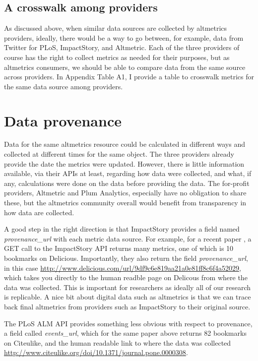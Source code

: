 \documentclass[letterpaper,superscriptaddress,showkeys,longbibliography]{revtex4-1}\usepackage{graphicx, color}
\begin{document}
\subsection*{A crosswalk among providers}

As discussed above, when similar data sources are collected by altmetrics providers, ideally, there would be a way to go between, for example, data from Twitter for PLoS, ImpactStory, and Altmetric. Each of the three providers of course has the right to collect metrics as needed for their purposes, but as altmetrics consumers, we should be able to compare data from the same source across providers. In Appendix Table A1, I provide a table to crosswalk metrics for the same data source among providers.

\section*{Data provenance}

Data for the same altmetrics resource could be calculated in different ways and collected at different times for the same object. The three providers already provide the date the metrics were updated. However, there is little information available, via their APIs at least, regarding how data were collected, and what, if any, calculations were done on the data before providing the data. The for-profit providers, Altmetric and Plum Analytics, especially have no obligation to share these, but the altmetrics community overall would benefit from transparency in how data are collected. 

A good step in the right direction is that ImpactStory provides a field named \emph{provenance\_url} with each metric data source. For example, for a recent paper \cite{piwowar2007}, a GET call to the ImpactStory API returns many metrics, one of which is 10 bookmarks on Delicious. Importantly, they also return the field \emph{provenance\_url}, in this case \url{http://www.delicious.com/url/9df9c6e819aa21a0e81ff8c6f4a52029}, which takes you directly to the human readble page on Delicous from where the data was collected. This is important for researchers as ideally all of our research is replicable. A nice bit about digital data such as altmetrics is that we can trace back final altmetrics from providers such as ImpactStory to their original source.

The PLoS ALM API provides something less obvious with respect to provenance, a field called \emph{events\_url}, which for the same paper above \cite{piwowar2007} returns 82 bookmarks on Citeulike, and the human readable link to where the data was collected \url{http://www.citeulike.org/doi/10.1371/journal.pone.0000308}. 
\end{document}

